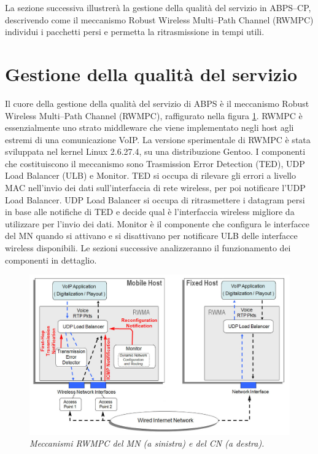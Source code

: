 \documentclass[12pt,a4paper,openright,twoside]{book}
\begin{document}
La sezione successiva illustrerà la gestione della qualità del
servizio in ABPS--CP, descrivendo come il meccanismo Robust Wireless
Multi--Path Channel (RWMPC) individui i pacchetti persi e permetta la
ritrasmissione in tempi utili.

\section{Gestione della qualità del servizio}

Il cuore della gestione della qualità del servizio di ABPS è il
meccanismo Robust Wireless Multi--Path Channel (RWMPC), raffigurato
nella figura \ref{fig:abps:rwmpc}. RWMPC è essenzialmente uno strato
middleware che viene implementato negli host agli estremi di una
comunicazione VoIP. La versione sperimentale di RWMPC è stata
sviluppata nel kernel Linux 2.6.27.4, su una distribuzione Gentoo. I
componenti che costituiscono il meccanismo sono Trasmission Error
Detection (TED), UDP Load Balancer (ULB) e Monitor. TED si occupa di
rilevare gli errori a livello MAC nell'invio dei dati sull'interfaccia
di rete wireless, per poi notificare l'UDP Load Balancer. UDP Load
Balancer si occupa di ritrasmettere i datagram persi in base alle
notifiche di TED e decide qual è l'interfaccia wireless migliore da
utilizzare per l'invio dei dati. Monitor è il componente che configura
le interfacce del MN quando si attivano e si disattivano per
notificare ULB delle interfacce wireless disponibili. Le sezioni
successive analizzeranno il funzionamento dei componenti in dettaglio.

\begin{figure}[tb]
  \centering
  \includegraphics[width=\textwidth]{img/rwma}
  \caption{\em Meccanismi RWMPC del MN (a sinistra) e del CN (a
    destra).}
  \label{fig:abps:rwmpc}
\end{figure}
\end{document}
